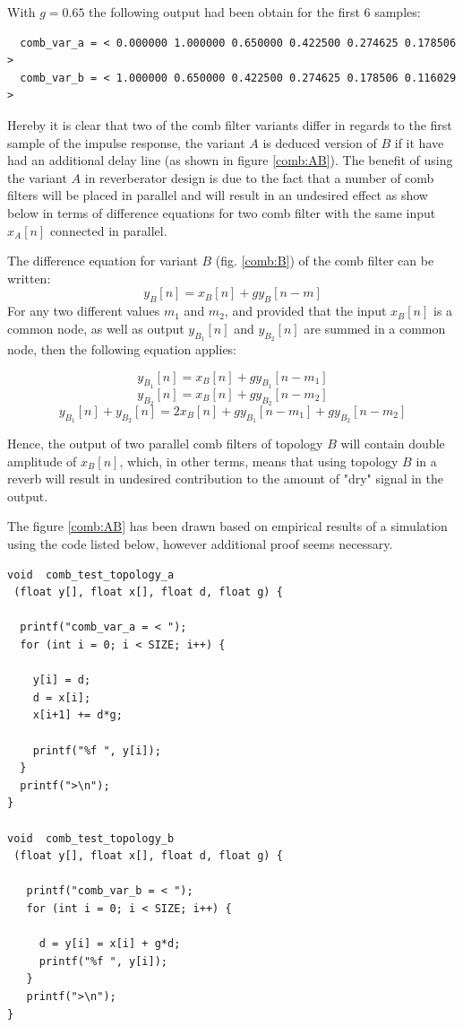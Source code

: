 \documentclass[12pt]{report}
\begin{document}
  With $g=0.65$ the following output had been obtain for the first 6 samples:
  \begin{verbatim}
  comb_var_a = < 0.000000 1.000000 0.650000 0.422500 0.274625 0.178506 >
  comb_var_b = < 1.000000 0.650000 0.422500 0.274625 0.178506 0.116029 >
  \end{verbatim}
  Hereby it is clear that two of the comb filter variants differ in regards to
  the first sample of the impulse response, the variant $A$ is deduced version of
  $B$ if it have had an additional delay line (as shown in figure \ref{comb:AB}).
  The benefit of using the variant $A$ in reverberator design is due to the fact
  that a number of comb filters will be placed in parallel and will result in an
  undesired effect as show below in terms of difference equations for two comb
  filter with the same input $x_A[n]$ connected in parallel.

  The difference equation for variant $B$ (fig. \ref{comb:B}) of the comb filter
  can be written:\begin{equation}
    y_B[n] = x_B[n] + gy_B[n-m]
  \end{equation}
  For any two different values $m_1$ and $m_2$, and provided that the input
  $x_B[n]$ is a common node, as well as output $y_{B_1}[n]$ and $y_{B_2}[n]$
  are summed in a common node, then the following equation applies:

  \[ y_{B_1}[n] = x_B[n] + gy_{B_1}[n-m_1] \]
  \[ y_{B_2}[n] = x_B[n] + gy_{B_2}[n-m_2] \]
  \[ y_{B_1}[n] + y_{B_2}[n] = 2x_{B}[n] + gy_{B_1}[n-m_1] + gy_{B_2}[n-m_2] \]

  Hence, the output of two parallel comb filters of topology $B$ will contain
  double amplitude of $x_B[n]$, which, in other terms, means that using topology
  $B$ in a reverb will result in undesired contribution to the amount of "dry"
  signal in the output.

  The figure \ref{comb:AB} has been drawn based on empirical results of a
  simulation using the code listed below, however additional proof seems
  necessary.

  \vspace{2em}

\begin{lstlisting}
void  comb_test_topology_a
 (float y[], float x[], float d, float g) {

  printf("comb_var_a = < ");
  for (int i = 0; i < SIZE; i++) {
  
    y[i] = d;
    d = x[i];
    x[i+1] += d*g;
  
    printf("%f ", y[i]);
  }
  printf(">\n");
}

void  comb_test_topology_b
 (float y[], float x[], float d, float g) {

   printf("comb_var_b = < ");
   for (int i = 0; i < SIZE; i++) {

     d = y[i] = x[i] + g*d;
     printf("%f ", y[i]);
   }
   printf(">\n");
}
\end{lstlisting}
\end{document}
